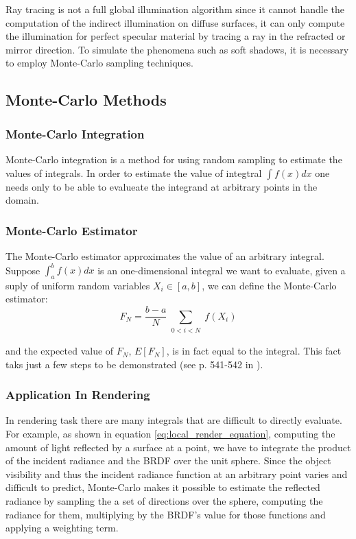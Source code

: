 Ray tracing is not a full global illumination algorithm since it cannot handle the computation of the indirect illumination on diffuse surfaces, it can only compute the illumination for perfect specular material by tracing a ray in the refracted or mirror direction. To simulate the phenomena such as soft shadows, it is necessary to employ Monte-Carlo sampling techniques. 

\subsection{Monte-Carlo Methods}

\subsubsection{Monte-Carlo Integration} 
Monte-Carlo integration is a method for using random sampling to estimate the values of integrals. In order to estimate the value of integtral \( \int f(x)dx \) one needs only to be able to evalueate the integrand at arbitrary points in the domain. 

\subsubsection{Monte-Carlo Estimator} 
The Monte-Carlo estimator approximates the value of an arbitrary integral. Suppose \( \int_{a}^{b}f(x)dx \) is an one-dimensional integral we want to evaluate, given a suply of uniform random variables \( X_{i} \in [a, b] \), we can define the Monte-Carlo estimator: 
\begin{equation}
F_{N} = \frac{b-a}{N}\sum_{\substack{0<i<N}}f(X_{i})
\end{equation}

and the expected value of \(F_{N}\), \(E[F_{N}]\), is in fact equal to the integral. This fact taks just a few steps to be demonstrated (see p. 541-542 in \cite{Pharr:2010:PBR:1854996}). 

\subsubsection{Application In Rendering} 
In rendering task there are many integrals that are difficult to directly evaluate. For example, as shown in equation \ref{eq:local_render_equation}, computing the amount of light reflected by a surface at a point, we have to integrate the product of the incident radiance and the BRDF over the unit sphere. Since the object visibility and thus the incident radiance function at an arbitrary point varies and difficult to predict, Monte-Carlo makes it possible to estimate the reflected radiance by sampling the a set of directions over the sphere, computing the radiance for them, multiplying by the BRDF's value for those functions and applying a weighting term. 

